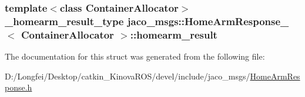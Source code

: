 \subsubsection[{\texorpdfstring{homearm\+\_\+result}{homearm_result}}]{\setlength{\rightskip}{0pt plus 5cm}template$<$class Container\+Allocator$>$ {\bf \+\_\+homearm\+\_\+result\+\_\+type} {\bf jaco\+\_\+msgs\+::\+Home\+Arm\+Response\+\_\+}$<$ Container\+Allocator $>$\+::homearm\+\_\+result}\hypertarget{structjaco__msgs_1_1HomeArmResponse___a2efd00ce949c689141e24a0c2feac589}{}\label{structjaco__msgs_1_1HomeArmResponse___a2efd00ce949c689141e24a0c2feac589}


The documentation for this struct was generated from the following file\+:\begin{DoxyCompactItemize}
\item 
D\+:/\+Longfei/\+Desktop/catkin\+\_\+\+Kinova\+R\+O\+S/devel/include/jaco\+\_\+msgs/\hyperlink{HomeArmResponse_8h}{Home\+Arm\+Response.\+h}\end{DoxyCompactItemize}
